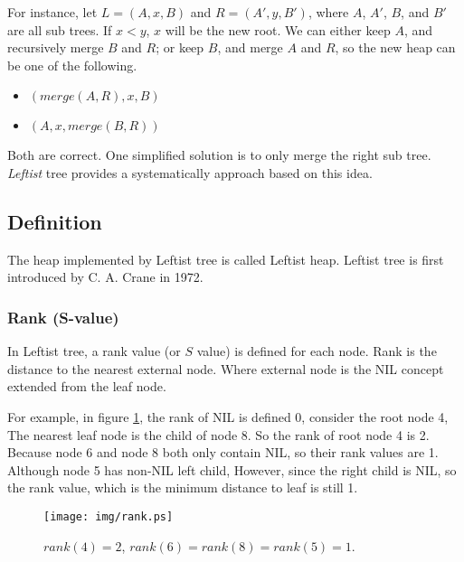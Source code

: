 \documentclass{article}
\begin{document}
For instance, let $L = (A, x, B)$ and $R = (A', y, B')$, where $A$, $A'$, $B$,
and $B'$ are all sub trees. If $x < y$, $x$ will be the new root.
We can either keep $A$, and recursively merge $B$ and $R$; or
keep $B$, and merge $A$ and $R$, so the new heap can be one
of the following.

\begin{itemize}
\item $(merge(A, R), x, B)$
\item $(A, x, merge(B, R))$
\end{itemize}

Both are correct. One simplified solution is to only merge the right
sub tree. {\em Leftist} tree provides a systematically approach based on this
idea.

\subsection{Definition}

The heap implemented by Leftist tree is called Leftist heap. Leftist
tree is first introduced by C. A. Crane in 1972\cite{wiki-leftist-tree}.

\subsubsection{Rank (S-value)}

In Leftist tree, a rank value (or $S$ value) is defined for each node.
Rank is the distance to the nearest external node. Where external node
is the NIL concept extended from the leaf node.

For example, in figure \ref{fig:rank}, the rank of NIL
is defined 0, consider the root node 4, The nearest leaf node is
the child of node 8. So the rank of root node 4 is 2. Because node
6 and node 8 both only contain NIL, so their rank values are 1.
Although node 5 has non-NIL left child, However, since the right
child is NIL, so the rank value, which is the minimum distance
to leaf is still 1.

\begin{figure}[htbp]
   \begin{center}
     \texttt{[image: img/rank.ps]}
     \caption{$rank(4) = 2$, $rank(6) = rank(8) = rank(5) = 1$.} \label{fig:rank}
   \end{center}
\end{figure}
\end{document}
